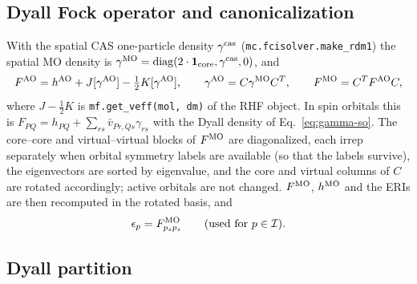 \documentclass[11pt,a4paper]{article}
\newcommand{\code}[1]{\texttt{#1}}
\begin{document}
\subsection{Dyall Fock operator and canonicalization}
\label{sec:canon}

With the spatial CAS one-particle density $\gamma^{\rm cas}$
(\code{mc.fcisolver.make\_rdm1}) the spatial MO density is
$\gamma^{\rm MO}=\operatorname{diag}(2\cdot\mathbf 1_{\rm core},\gamma^{\rm cas},0)$,
and
\begin{equation}
  F^{\rm AO}=h^{\rm AO}+J[\gamma^{\rm AO}]-\tfrac12K[\gamma^{\rm AO}],\qquad
  \gamma^{\rm AO}=C\gamma^{\rm MO}C^{T},\qquad
  F^{\rm MO}=C^{T}F^{\rm AO}C ,
  \label{eq:fock}
\end{equation}
where $J-\tfrac12K$ is \code{mf.get\_veff(mol,\,dm)} of the RHF object.  In
spin orbitals this is $F_{PQ}=h_{PQ}+\sum_{rs}\bar v_{Pr,Qs}\gamma_{rs}$
with the Dyall density of Eq.~\eqref{eq:gamma-so}.  The core--core and
virtual--virtual blocks of $F^{\rm MO}$ are diagonalized, each irrep
separately when orbital symmetry labels are available (so that the labels
survive), the eigenvectors are sorted by eigenvalue, and the core and virtual
columns of $C$ are rotated accordingly; active orbitals are not changed.
$F^{\rm MO}$, $h^{\rm MO}$ and the ERIs are then recomputed in the rotated
basis, and
\begin{equation}
  \epsilon_p=F^{\rm MO}_{p_sp_s}\qquad(\text{used for }p\in\mathcal I).
  \label{eq:eps}
\end{equation}

\subsection{Dyall partition}
\end{document}
